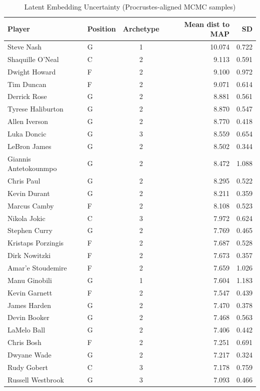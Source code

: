 \begin{table}[t]
\caption*{
{\fontsize{20}{25}\selectfont  Latent Embedding Uncertainty (Procrustes-aligned MCMC samples)\fontsize{12}{15}\selectfont }
} 
\fontsize{12.0pt}{14.0pt}\selectfont
\begin{tabular*}{\linewidth}{@{\extracolsep{\fill}}llcrr}
\toprule
Player & Position & Archetype & Mean dist to MAP & SD \\ 
\midrule\addlinespace[2.5pt]
Steve Nash & G & 1 & 10.074 & 0.722 \\ 
Shaquille O'Neal & C & 2 & 9.113 & 0.591 \\ 
Dwight Howard & F & 2 & 9.100 & 0.972 \\ 
Tim Duncan & F & 2 & 9.071 & 0.614 \\ 
Derrick Rose & G & 2 & 8.881 & 0.561 \\ 
Tyrese Haliburton & G & 2 & 8.870 & 0.547 \\ 
Allen Iverson & G & 2 & 8.770 & 0.418 \\ 
Luka Doncic & G & 3 & 8.559 & 0.654 \\ 
LeBron James & G & 2 & 8.502 & 0.344 \\ 
Giannis Antetokounmpo & G & 2 & 8.472 & 1.088 \\ 
Chris Paul & G & 2 & 8.295 & 0.522 \\ 
Kevin Durant & G & 2 & 8.211 & 0.359 \\ 
Marcus Camby & F & 2 & 8.108 & 0.523 \\ 
Nikola Jokic & C & 3 & 7.972 & 0.624 \\ 
Stephen Curry & G & 2 & 7.769 & 0.465 \\ 
Kristaps Porzingis & F & 2 & 7.687 & 0.528 \\ 
Dirk Nowitzki & F & 2 & 7.673 & 0.357 \\ 
Amar'e Stoudemire & F & 2 & 7.659 & 1.026 \\ 
Manu Ginobili & G & 1 & 7.604 & 1.183 \\ 
Kevin Garnett & F & 2 & 7.547 & 0.439 \\ 
James Harden & G & 2 & 7.470 & 0.378 \\ 
Devin Booker & G & 2 & 7.468 & 0.563 \\ 
LaMelo Ball & G & 2 & 7.406 & 0.442 \\ 
Chris Bosh & F & 2 & 7.251 & 0.691 \\ 
Dwyane Wade & G & 2 & 7.217 & 0.324 \\ 
Rudy Gobert & C & 3 & 7.178 & 0.759 \\ 
Russell Westbrook & G & 3 & 7.093 & 0.466 \\ 

\end{tabular*}
\end{table}
